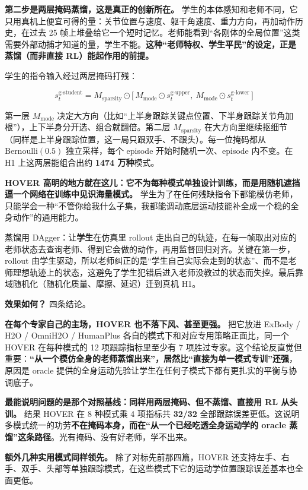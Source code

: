\documentclass[
  chinese,
]{ctexart}
\begin{document}
\textbf{第二步是两层掩码蒸馏，这是真正的创新所在。}
学生的本体感知和老师不同，它只用真机上便宜可得的量：关节位置与速度、躯干角速度、重力方向，再加动作历史，在过去
25
帧上堆叠给它一个短时记忆。老师能看到``各刚体的全局位置''这类需要外部动捕才知道的量，学生不能。\textbf{这种``老师特权、学生平民''的设定，正是蒸馏（而非直接
RL）能起作用的前提。}

学生的指令输入经过两层掩码打残：

\[s_t^\text{g-student} = M_\text{sparsity} \odot \big[\, M_\text{mode} \odot s_t^\text{g-upper},\ M_\text{mode} \odot s_t^\text{g-lower} \,\big]\]

第一层 \(M_\text{mode}\)
决定大方向（比如``上半身跟踪关键点位置、下半身跟踪关节角加根''），上下半身分开选、组合就翻倍。第二层
\(M_\text{sparsity}\)
在大方向里继续抠细节（同样是上半身跟踪位置，这一局只跟双手、不跟头）。每一位掩码都从
\(\text{Bernoulli}(0.5)\) 独立采样，每个 episode 开始时随机一次、episode
内不变。在 H1 上这两层能组合出约 \textbf{1474 万种}模式。

\textbf{HOVER
高明的地方就在这儿：它不为每种模式单独设计训练，而是用随机遮挡逼一个网络在训练中见识海量模式。}
学生为了在任何残缺指令下都能模仿老师，只能学会一种``不管你给我什么子集，我都能调动底层运动技能补全成一个稳的全身动作''的通用能力。

蒸馏用 DAgger：让\textbf{学生}在仿真里 rollout
走出自己的轨迹，在每一帧取出对应的老师状态去查询老师、得到它会做的动作，再用监督回归对齐。关键在第一步，rollout
由学生驱动，所以老师纠正的是``学生自己实际会走到的状态''、而不是老师理想轨迹上的状态，这避免了学生犯错后进入老师没教过的状态而失控。最后靠域随机化（随机化质量、摩擦、延迟）迁到真机
H1。

\textbf{效果如何？} 四条结论。

\textbf{在每个专家自己的主场，HOVER 也不落下风、甚至更强。} 把它放进
ExBody / H2O / OmniH2O / HumanPlus
各自的模式下和对应专用策略正面比，同一个 HOVER 在每种模式的 12
项跟踪指标里至少有 7
项胜过专家。这个结论反直觉但重要：\textbf{``从一个模仿全身的老师蒸馏出来''，居然比``直接为单一模式专训''还强}，原因是
oracle
提供的全身运动先验让学生在任何子模式下都有更扎实的平衡与协调底子。

\textbf{最能说明问题的是那个对照基线：同样用两层掩码、但不蒸馏、直接用
RL 从头训。} 结果 HOVER 在 8 种模式乘 4 项指标共 \textbf{32/32}
全部跟踪误差更低。这说明多模式统一的功劳\textbf{不在掩码本身，而在``从一个已经吃透全身运动学的
oracle 蒸馏''这条路径}。光有掩码、没有好老师，学不出来。

\textbf{额外几种实用模式同样领先。} 除了对标先前那四篇，HOVER
还支持左手、右手、双手、头部等单独跟踪模式，在这些模式下它的运动学位置跟踪误差基本也全面更低。
\end{document}

